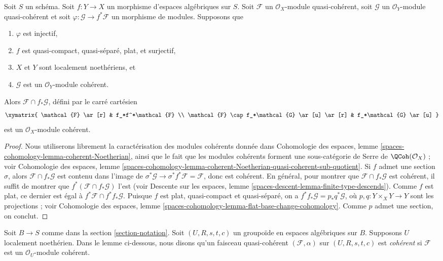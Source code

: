 \begin{lemma}
\label{lemma-push-pull}
Soit $S$ un schéma. Soit $f : Y \to X$ un morphisme d'espaces algébriques sur $S$. Soit $\mathcal{F}$ un $\mathcal{O}_X$-module quasi-cohérent, soit $\mathcal{G}$ un $\mathcal{O}_Y$-module quasi-cohérent et soit $\varphi : \mathcal{G} \to f^*\mathcal{F}$ un morphisme de modules. Supposons que
\begin{enumerate}
\item $\varphi$ est injectif,
\item $f$ est quasi-compact, quasi-séparé, plat, et surjectif,
\item $X$ et $Y$ sont localement noethériens, et
\item $\mathcal{G}$ est un $\mathcal{O}_Y$-module cohérent.
\end{enumerate}
Alors $\mathcal{F} \cap f_*\mathcal{G}$, défini par le carré cartésien
$$
\xymatrix{
\mathcal{F} \ar[r] & f_*f^*\mathcal{F} \\
\mathcal{F} \cap f_*\mathcal{G} \ar[u] \ar[r] &
f_*\mathcal{G} \ar[u]
}
$$
est un $\mathcal{O}_X$-module cohérent.
\end{lemma}

\begin{proof}
Nous utiliserons librement la caractérisation des modules cohérents donnée dans Cohomologie des espaces, lemme \ref{spaces-cohomology-lemma-coherent-Noetherian}, ainsi que le fait que les modules cohérents forment une sous-catégorie de Serre de $\QCoh(\mathcal{O}_X)$ ; voir Cohomologie des espaces, lemme \ref{spaces-cohomology-lemma-coherent-Noetherian-quasi-coherent-sub-quotient}. Si $f$ admet une section $\sigma$, alors $\mathcal{F} \cap f_*\mathcal{G}$ est contenu dans l'image de $\sigma^*\mathcal{G} \to \sigma^*f^*\mathcal{F} = \mathcal{F}$, donc est cohérent. En général, pour montrer que $\mathcal{F} \cap f_*\mathcal{G}$ est cohérent, il suffit de montrer que $f^*(\mathcal{F} \cap f_*\mathcal{G})$ l'est (voir Descente sur les espaces, lemme \ref{spaces-descent-lemma-finite-type-descends}). Comme $f$ est plat, ce dernier est égal à $f^*\mathcal{F} \cap f^*f_*\mathcal{G}$. Puisque $f$ est plat, quasi-compact et quasi-séparé, on a $f^*f_*\mathcal{G} = p_*q^*\mathcal{G}$, où $p, q : Y \times_X Y \to Y$ sont les projections ; voir Cohomologie des espaces, lemme \ref{spaces-cohomology-lemma-flat-base-change-cohomology}. Comme $p$ admet une section, on conclut.
\end{proof}

\noindent
Soit $B \to S$ comme dans la section \ref{section-notation}. Soit $(U, R, s, t, c)$ un groupoïde en espaces algébriques sur $B$. Supposons $U$ localement noethérien. Dans le lemme ci-dessous, nous disons qu'un faisceau quasi-cohérent $(\mathcal{F}, \alpha)$ sur $(U, R, s, t, c)$ est {\it cohérent} si $\mathcal{F}$ est un $\mathcal{O}_U$-module cohérent.

